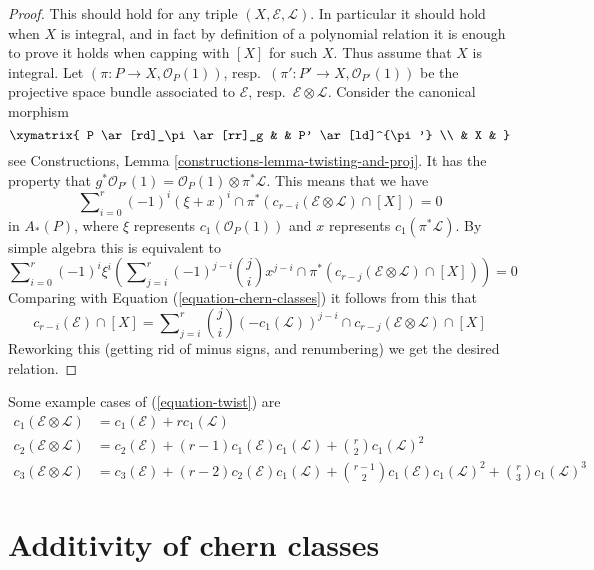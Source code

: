 \begin{proof}
This should hold for any triple $(X, \mathcal{E}, \mathcal{L})$.
In particular it should hold when $X$ is integral, and in fact by
definition of a polynomial relation it is enough to prove
it holds when capping with $[X]$ for such $X$. Thus assume
that $X$ is integral. Let $(\pi : P \to X, \mathcal{O}_P(1))$,
resp.\ $(\pi' : P' \to X, \mathcal{O}_{P'}(1))$ be the
projective space bundle associated to $\mathcal{E}$,
resp.\ $\mathcal{E} \otimes \mathcal{L}$. Consider the canonical morphism
$$
\xymatrix{
P \ar[rd]_\pi \ar[rr]_g & & P' \ar[ld]^{\pi'} \\
& X &
}
$$
see Constructions, Lemma \ref{constructions-lemma-twisting-and-proj}.
It has the property that
$g^*\mathcal{O}_{P'}(1)
= \mathcal{O}_P(1) \otimes \pi^* {\mathcal L}$.
This means that we have
$$
\sum\nolimits_{i = 0}^r
(-1)^i
(\xi + x)^i \cap \pi^*(c_{r - i}(\mathcal{E} \otimes \mathcal{L}) \cap [X])
=
0
$$
in $A_*(P)$, where $\xi$ represents
$c_1(\mathcal{O}_P(1))$ and $x$
represents $c_1(\pi^*\mathcal{L})$. By simple algebra this
is equivalent to
$$
\sum\nolimits_{i = 0}^r
(-1)^i \xi^i \left(
\sum\nolimits_{j = i}^r
(-1)^{j - i}
\binom{j}{i}
x^{j - i} \cap
\pi^*(c_{r - j}(\mathcal{E} \otimes \mathcal{L}) \cap [X])
\right)
=
0
$$
Comparing with
Equation (\ref{equation-chern-classes}) it follows from this that
$$
c_{r - i}(\mathcal{E}) \cap [X] =
\sum\nolimits_{j = i}^r
\binom{j}{i}
(-c_1(\mathcal{L}))^{j - i} \cap
c_{r - j}(\mathcal{E} \otimes \mathcal{L}) \cap [X]
$$
Reworking this (getting rid of minus signs, and renumbering) we get
the desired relation.
\end{proof}

\noindent
Some example cases of (\ref{equation-twist}) are
\begin{align*}
c_1(\mathcal{E} \otimes \mathcal{L})
& =
c_1(\mathcal{E}) +
r c_1(\mathcal{L}) \\
c_2(\mathcal{E} \otimes \mathcal{L})
& =
c_2(\mathcal{E}) +
(r - 1) c_1(\mathcal{E}) c_1(\mathcal{L}) +
\binom{r}{2} c_1(\mathcal{L})^2 \\
c_3(\mathcal{E} \otimes \mathcal{L})
& =
c_3(\mathcal{E}) +
(r - 2) c_2(\mathcal{E})c_1(\mathcal{L}) +
\binom{r - 1}{2} c_1(\mathcal{E})c_1(\mathcal{L})^2 +
\binom{r}{3} c_1(\mathcal{L})^3
\end{align*}








\section{Additivity of chern classes}
\label{section-additivity-chern-classes}


